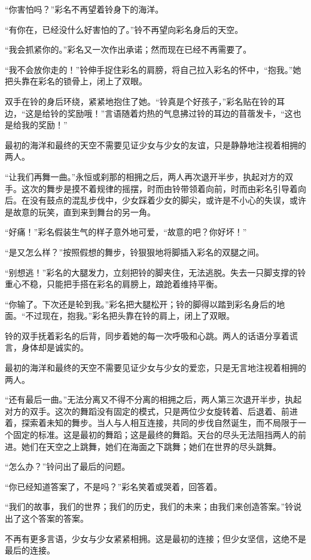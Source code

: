 “你害怕吗？”彩名不再望着铃身下的海洋。

“有你在，已经没什么好害怕的了。”铃不再望向彩名身后的天空。

“我会抓紧你的。”彩名又一次作出承诺；然而现在已经不再需要了。

“我不会放你走的！”铃伸手捉住彩名的肩膀，将自己拉入彩名的怀中，“抱我。”她把头靠在彩名的锁骨上，闭上了双眼。

双手在铃的身后环绕，紧紧地抱住了她。“铃真是个好孩子，”彩名贴在铃的耳边，“这是给铃的奖励哦！”言语随着灼热的气息拂过铃的耳边的苜蓿发卡，“这也是给我的奖励！”

最初的海洋和最终的天空不需要见证少女与少女的友谊，只是静静地注视着相拥的两人。

“让我们再舞一曲。”永恒或刹那的相拥之后，两人再次退开半步，执起对方的双手。这次的舞步是摸不着规律的摇摆，时而由铃带领着向前，时而由彩名引导着向后。在没有鼓点的混乱步伐中，少女踩着少女的脚尖，或许是不小心的失误，或许是故意的玩笑，直到来到舞台的另一角。

“好痛！”彩名假装生气的样子意外地可爱，“故意的吧？你好坏！”

“是又怎么样？”按照假想的舞步，铃狠狠地将脚插入彩名的双腿之间。

“别想逃！”彩名的大腿发力，立刻把铃的脚夹住，无法逃脱。失去一只脚支撑的铃重心不稳，只能把手搭在彩名的肩膀上，踉跄着维持平衡。

“你输了。下次还是轮到我。”彩名把大腿松开；铃的脚得以踏到彩名身后的地面。“不过现在，抱我。”彩名把头靠在铃的肩上，闭上了双眼。

铃的双手抚着彩名的后背，同步着她的每一次呼吸和心跳。两人的话语分享着谎言，身体却是诚实的。

最初的海洋和最终的天空不需要见证少女与少女的爱恋，只是无言地注视着相拥的两人。

“还有最后一曲。”无法分离又不得不分离的相拥之后，两人第三次退开半步，执起对方的双手。这次的舞蹈没有固定的模式，只是两位少女旋转着、后退着、前进着，探索着未知的舞步。当人与人相互连接，共同的步伐自然诞生，而不局限于一个固定的标准。这是最初的舞蹈；这是最终的舞蹈。天台的尽头无法阻挡两人的前进。她们在天空之上跳舞，她们在海面之下跳舞；她们在世界的尽头跳舞。

“怎么办？”铃问出了最后的问题。

“你已经知道答案了，不是吗？”彩名笑着或哭着，回答着。

“我们的故事，我们的世界；我们的历史，我们的未来；由我们来创造答案。”铃说出了这个答案的答案。

不再有更多言语，少女与少女紧紧相拥。这是最初的连接；但少女坚信，这绝不是最后的连接。


